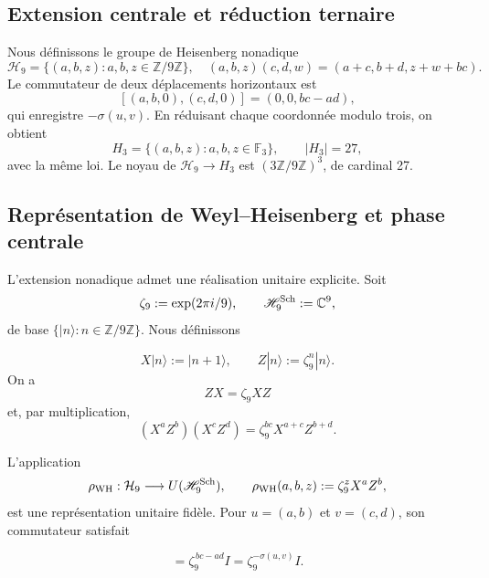 \subsection{Extension centrale et réduction ternaire}

Nous définissons le groupe de Heisenberg nonadique
\begin{equation}
 \mathcal H_9=\{(a,b,z):a,b,z\in\mathbb Z/9\mathbb Z\},
 \quad
 (a,b,z)(c,d,w)=(a+c,b+d,z+w+bc).
 \label{p12-83-c20-s6:eq:heisenberg-9-nuevo}
\end{equation}
Le commutateur de deux déplacements horizontaux est
\[
 [(a,b,0),(c,d,0)]=(0,0,bc-ad),
\]
qui enregistre \(-\sigma(u,v)\). En réduisant chaque coordonnée modulo trois, on
obtient
\begin{equation}
 H_3=\{(a,b,z):a,b,z\in\mathbb F_3\},\qquad |H_3|=27,
 \label{p12-83-c20-s6:eq:heisenberg-3-nuevo}
\end{equation}
avec la même loi. Le noyau de \(\mathcal H_9\to H_3\) est \((3\mathbb Z/9\mathbb Z)^3\), de cardinal 27.

\subsection{Représentation de Weyl--Heisenberg et phase centrale}

L’extension nonadique admet une réalisation unitaire explicite. Soit
\[
 \zeta_9:=\exp(2\pi i/9),
 \qquad
 \mathscr H_9^{\rm Sch}:=\mathbb C^9,
\]
de base \(\{|n\rangle:n\in\mathbb Z/9\mathbb Z\}\). Nous définissons

\begin{equation}
 X|n\rangle:=|n+1\rangle,
 \qquad
 Z|n\rangle:=\zeta_9^n|n\rangle.
 \label{p12-83-c20-s6:eq:weyl-desplazamiento-fase-u029}
\end{equation}
On a
\[
 ZX=\zeta_9XZ
\]
et, par multiplication,
\begin{equation}
 (X^aZ^b)(X^cZ^d)
 =\zeta_9^{bc}X^{a+c}Z^{b+d}.
 \label{p12-83-c20-s6:eq:cociclo-weyl-nonadico-u029}
\end{equation}

\begin{theorem}
\label{p12-83-c20-s6:thm:representacion-weyl-heisenberg-u029}
L'application
\begin{equation}
 \rho_{\rm WH}:\mathcal H_9\longrightarrow
 U(\mathscr H_9^{\rm Sch}),
 \qquad
 \rho_{\rm WH}(a,b,z):=\zeta_9^zX^aZ^b,
 \label{p12-83-c20-s6:eq:representacion-weyl-heisenberg-u029}
\end{equation}
est une représentation unitaire fidèle. Pour
\(u=(a,b)\) et \(v=(c,d)\), son commutateur satisfait

\begin{equation}
 [\rho_{\rm WH}(u,0),\rho_{\rm WH}(v,0)]
 =\zeta_9^{\,bc-ad}I
 =\zeta_9^{-\sigma(u,v)}I.
 \label{p12-83-c20-s6:eq:conmutador-weyl-holonomia-u029}
\end{equation}
\end{theorem}

